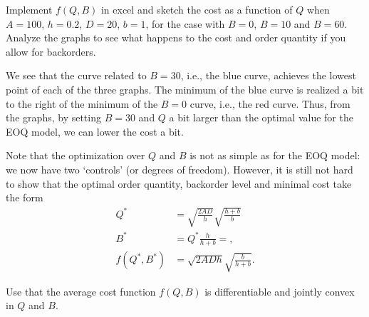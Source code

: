 \begin{exercise}
Implement $f(Q,B)$ in excel and sketch the cost as a function of $Q$ when $A=100$, $h=0.2$, $D=20$, $b=1$, for the case with $B=0$, $B=10$ and $B=60$.
  Analyze the graphs to see what happens to the  cost and order quantity if you allow for backorders.
  \begin{solution}
\begin{center}
\end{center}


We see that the curve related to $B=30$, i.e., the
blue curve, achieves the lowest point of each of the three graphs.
The minimum of the blue curve is realized a bit to the right of the
minimum of the $B=0$ curve, i.e., the red curve.  Thus, from the
graphs, by setting $B=30$ and $Q$ a bit larger than the optimal value
for the EOQ model, we can lower the cost a bit.
\end{solution}
\end{exercise}

\begin{exercise}
Note that the optimization over $Q$ and $B$ is not as simple as for the EOQ model: we
    now have two `controls' (or degrees of freedom). However, it is still not hard to  show that
 the optimal order quantity,  backorder level and minimal cost take the form
\begin{align*}
Q^* &= \sqrt{\frac{2AD}{h}} \sqrt{\frac{h+b}{b}} \\
B^* &= Q^* \frac{h}{h+b} = , \\
f(Q^*,B^*)  & = \sqrt{2ADh} \sqrt{\frac{b}{h+b}}.
\end{align*}

  \begin{solution}
Use that the average cost function $f(Q,B)$ is differentiable and jointly convex in $Q$ and $B$.
  \end{solution}
\end{exercise}


